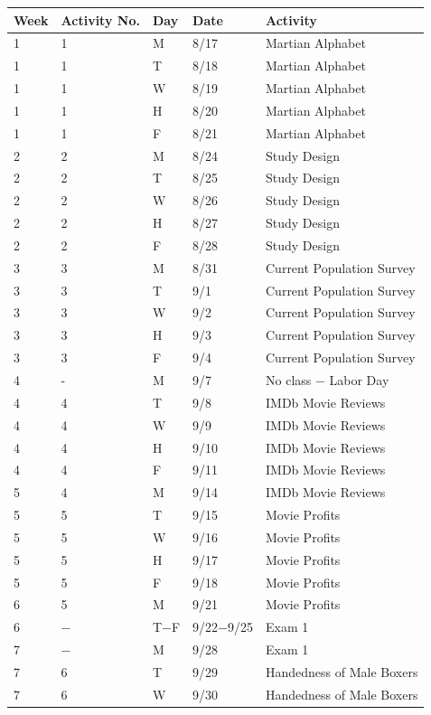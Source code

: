 \documentclass[
]{report}
\begin{document}
\begin{longtable}{|p{}|l|p{}|l|p{}|}
\hline
\textbf{Week}& \textbf{Activity No.}& \textbf{Day}& \textbf{Date}& \textbf{Activity} \\ \hline
\endhead
1& 1& M& 8/17& Martian Alphabet \\*
1& 1& T& 8/18& Martian Alphabet \\*
1& 1& W& 8/19& Martian Alphabet \\*
1& 1& H& 8/20& Martian Alphabet \\*
1& 1& F& 8/21& Martian Alphabet \\ \hline
2& 2& M& 8/24& Study Design \\*
2& 2& T& 8/25& Study Design \\*
2& 2& W& 8/26& Study Design \\*
2& 2& H& 8/27& Study Design \\*
2& 2& F& 8/28& Study Design \\ \hline
3& 3& M& 8/31& Current Population Survey \\*
3& 3& T& 9/1& Current Population Survey \\*
3& 3& W& 9/2& Current Population Survey \\*
3& 3& H& 9/3& Current Population Survey \\*
3& 3& F& 9/4& Current Population Survey \\ \hline
4& -& M& 9/7&	No class $-$ Labor Day \\*
4& 4& T& 9/8& IMDb Movie Reviews \\*
4& 4& W& 9/9& IMDb Movie Reviews \\*
4& 4& H& 9/10& IMDb Movie Reviews \\*
4& 4& F& 9/11& IMDb Movie Reviews \\ \hline
5& 4& M& 9/14& IMDb Movie Reviews \\*
5& 5& T& 9/15& Movie Profits \\*
5& 5& W& 9/16& Movie Profits \\*	
5& 5& H& 9/17& Movie Profits \\*
5& 5& F& 9/18& Movie Profits \\ \hline
6& 5& M& 9/21& Movie Profits \\*
6& $-$& T$-$F& 9/22$-$9/25& Exam 1 \\ \hline
7& $-$& M& 9/28& Exam 1 \\*
7& 6& T& 9/29& Handedness of Male Boxers \\*
7& 6& W& 9/30& Handedness of Male Boxers \\*	

\end{longtable}
\end{document}
